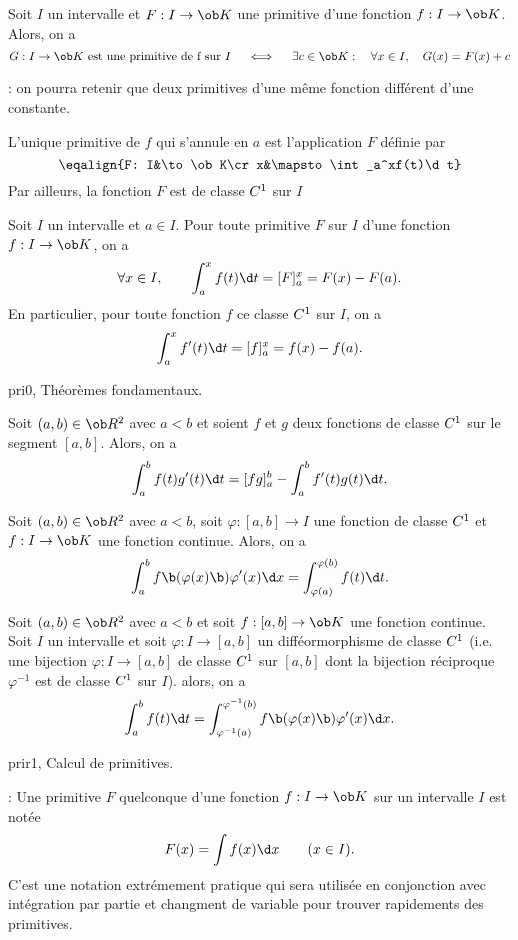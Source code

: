 \Propriete []  Soit $I$ un intervalle et $F:I\to\ob K$ une primitive d'une fonction $f:I\to\ob K$. 
Alors, on a 
$$
G:I\to\ob K\mbox{ est une primitive de f sur }I\quad\ \Longleftrightarrow\quad\  \exists c\in\ob K : \quad \forall x\in I, \quad G(x)=F(x)+c
$$

\Remarque : on pourra retenir que deux primitives d'une même fonction différent d'une constante. 
\bigskip

\Theoreme [Title=Théorème fondamental de l'analyse;$f:I\to\ob K$ continue sur un intervalle $I$, $a\in I$] 
L'unique primitive de $f$ qui s'annule en $a$ est l'application $F$ définie par 
$$
\eqalign{F: I&\to\ob K\cr x&\mapsto  \int_a^xf(t)\d t}
$$
Par ailleurs, la fonction $F$ est de classe $\sc C^1$ sur $I$


\Propriete []  Soit $I$ un intervalle et $a\in I$. Pour toute primitive $F$ sur $I$ d'une fonction $f:I\to\ob K$, on a 
$$
\forall x\in I, \qquad \int_a^x f(t)\d t=[F]_a^x=F(x)-F(a). 
$$
En particulier, pour toute fonction $f$ ce classe $\sc C^1$ sur $I$, on a 
$$
\int_a^xf'(t)\d t=[f]_a^x=f(x)-f(a). 
$$

\Subsection pri0, Théorèmes fondamentaux. 

\Theoreme [Index=Theoreme@Théorème!Integration par partie@Intégration par partie;Title=Intégration par partie]
Soit $(a,b)\in\ob R^2$ avec $a< b$ et soient $f$ et $g$ deux fonctions de classe $\sc C^1$ sur le segment $[a,b]$. Alors, on a 
$$
\int_a^bf(t)g'(t)\d t=[fg]_a^b-\int_a^bf'(t)g(t)\d t. 
$$

\Theoreme [Index=Theoreme@Théorème!de changement de variable;Title=Changement de variable]
Soit $(a,b)\in\ob R^2$ avec $a< b$, soit $\varphi:[a,b]\to I$ une fonction de classe $\sc C^1$ et $f:I\to\ob K$ une fonction continue. Alors, on a 
$$
\int_a^bf\b(\varphi(x)\b)\varphi'(x)\d x=\int_{\varphi(a)}^{\varphi(b)}f(t)\d t.
$$

\Theoreme [Index=Theoreme@Théorème!de changement de variable;Title=Changement de variable] 
Soit $(a,b)\in\ob R^2$ avec $a<b$ et soit $f:[a,b]\to\ob K$ une fonction continue. Soit $I$ un intervalle et soit $\varphi:I\to[a,b]$ un difféormorphisme de classe $\sc C^1$ (i.e. une bijection $\varphi:I\to[a,b]$ de classe $\sc C^1$ sur $[a,b]$ dont la bijection réciproque $\varphi^{-1}$ est de classe $\sc C^1$ sur $I$). alors, 
on a 
$$
\int_a^bf(t)\d t=\int_{\varphi^{-1}(a)}^{\varphi^{-1}(b)}f\b(\varphi(x)\b)\varphi'(x)\d x. 
$$

\Section prir1, Calcul de primitives. 

\Remarque : Une primitive $F$ quelconque d'une fonction $f:I\to\ob K$ sur un intervalle $I$ est notée
$$
F(x)=\int f(x)\d x\qquad (x\in I).
$$
C'est une notation extrémement pratique qui sera utilisée en conjonction avec intégration par partie et changment de variable pour trouver rapidements des primitives. 
\bigskip

